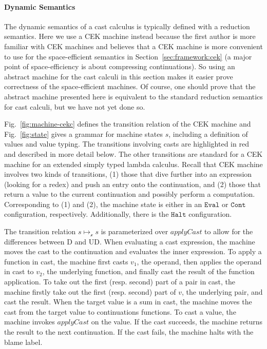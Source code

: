\documentclass[acmsmall,review,anonymous]{acmart}\settopmatter{printfolios=true,printccs=false,printacmref=false}
\newcommand{\judgeCreduce}[2]{#1 \longmapsto_{\mathcal{x}} #2}
\begin{document}
\paragraph{Dynamic Semantics}

The dynamic semantics of a cast calculus is typically defined with a
reduction semantics. Here we use a CEK machine
\citep{felleisen1986control} instead because the first author is more
familiar with CEK machines and believes that a CEK machine is more
convenient to use for the space-efficient semantics in
Section~\ref{sec:framework:cek} (a major point of space-efficiency is about 
compressing continuations). So using an abstract machine for the cast calculi in
this section makes it easier prove correctness of the space-efficient
machines. Of course, one should prove that the abstract machine
presented here is equivalent to the standard reduction semantics for
cast calculi, but we have not yet done so.

Fig.~\ref{fig:machine-cekc} defines the transition relation of the CEK
machine and Fig.~\ref{fig:state} gives a grammar for machine states
$s$, including a definition of values and value typing. The
transitions involving casts are highlighted in red and described in
more detail below. The other transitions are standard for a CEK
machine for an extended simply typed lambda calculus.
%
Recall that CEK machine involves two kinds of transitions, (1) those
that dive further into an expression (looking for a redex) and push an
entry onto the continuation, and (2) those that return a value to the
current continuation and possibly perform a computation.
Corresponding to (1) and (2), the machine state is either in an
$\mathtt{Eval}$ or $\mathtt{Cont}$ configuration, respectively.
Additionally, there is the $\mathtt{Halt}$ configuration.

The transition relation $\judgeCreduce{s}{s}$ is parameterized over
$applyCast$ to allow for the differences between D and UD.
%
When evaluating a cast expression, the machine moves the cast to the
continuation and evaluates the inner expression.
To apply a function in cast, the machine first casts $v_1$, the
operand, then applies the operand in cast to $v_2$, the underlying
function, and finally cast the result of the function application.
%
To take out the first (resp. second) part of a pair in cast, the
machine firstly take out the first (resp. second) part of $v$, the
underlying pair, and cast the result.
%
%
When the target value is a sum in cast, the machine moves the cast from
the target value to continuations functions.
%
To cast a value, the machine invokes $applyCast$ on the value.  If the
cast succeeds, the machine returns the result to the next
continuation.  If the cast fails, the machine halts with the blame
label.
%
\end{document}
